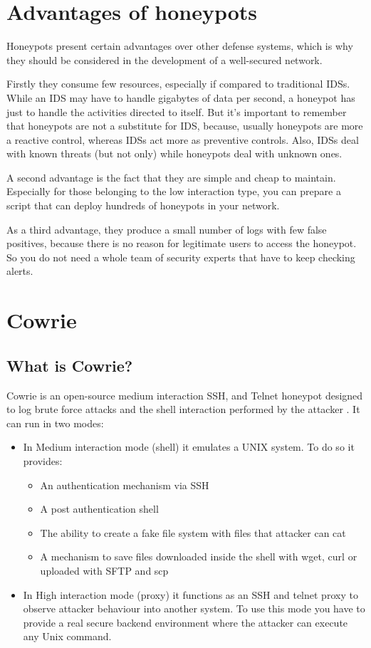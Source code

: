 \documentclass[epsfig,a4paper,11pt,titlepage,oneside,openany]{book}
\begin{document}
\begin{itemize}
\begin{itemize}
\end{itemize}

\chapter{Advantages of honeypots}
Honeypots present certain advantages over other defense systems, which is why they should be considered in the development of a well-secured network.

Firstly they consume few resources, especially if compared to traditional IDSs. While an IDS may have to handle gigabytes of data per second, a honeypot has just to handle the activities directed to itself. But it’s important to remember that honeypots are not a substitute for IDS, because, usually honeypots are more a reactive control, whereas IDSs act more as preventive controls. Also, IDSs deal with known threats (but not only) while honeypots deal with unknown ones.

A second advantage is the fact that they are simple and cheap  to maintain. Especially for those belonging to the low interaction type, you can prepare a script that can deploy hundreds of honeypots in your network.

As a third advantage, they produce a small number of logs with few false positives, because there is no reason for legitimate users to access the honeypot. So you do not need a whole team of security experts that have to keep checking alerts.

\chapter{Cowrie}

\section{What is Cowrie?}

Cowrie is an open-source medium interaction SSH, and Telnet honeypot designed to log brute force attacks and the shell interaction performed by the attacker \cite{whatcowrie}.
It can run in two modes:
\begin{itemize}
\itemsep0em
\item In Medium interaction mode (shell) it emulates a UNIX system. To do so it provides:
	\begin{itemize}
	\itemsep0em
	\item An authentication mechanism via SSH
	\item A  post authentication shell
	\item The ability to create a fake file system with files that attacker can cat
	\item A mechanism to save files downloaded inside the shell with wget, curl or uploaded with SFTP and scp
	\end{itemize}
\item In High interaction mode (proxy) it functions as an SSH and telnet proxy to observe attacker behaviour into another system. To use this mode you have to provide a real secure backend environment where the attacker can execute any Unix command.
\end{itemize}


\end{itemize}
\end{document}
